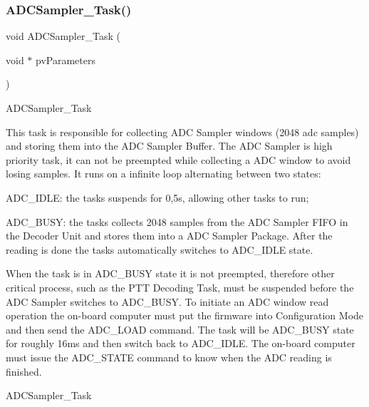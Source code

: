 \subsubsection{\texorpdfstring{A\+D\+C\+Sampler\+\_\+\+Task()}{ADCSampler\_Task()}}
{\footnotesize\ttfamily void A\+D\+C\+Sampler\+\_\+\+Task (\begin{DoxyParamCaption}\item[{void $\ast$}]{pv\+Parameters }\end{DoxyParamCaption})}

A\+D\+C\+Sampler\+\_\+\+Task

This task is responsible for collecting A\+DC Sampler windows (2048 adc samples) and storing them into the A\+DC Sampler Buffer. The A\+DC Sampler is high priority task, it can not be preempted while collecting a A\+DC window to avoid losing samples. It runs on a infinite loop alternating between two states\+:


\begin{DoxyPre}
\begin{DoxyItemize}
\item ADC\_IDLE: the tasks suspends for 0,5s, allowing other tasks to run;
\end{DoxyItemize}\end{DoxyPre}



\begin{DoxyPre}
\begin{DoxyItemize}
\item ADC\_BUSY: the tasks collects 2048 samples from the ADC Sampler FIFO
             in the Decoder Unit and stores them into a ADC Sampler Package.
             After the reading is done the tasks automatically switches to
             ADC\_IDLE state.
 
   When the task is in ADC\_BUSY state it is not preempted,
   therefore other critical process, such as the PTT Decoding Task,
   must be suspended before the ADC Sampler switches to ADC\_BUSY. To
   initiate an ADC window read operation the on-board computer must put the
   firmware into Configuration Mode and then send the ADC\_LOAD command.
   The task will be ADC\_BUSY state for roughly 16ms and then switch
   back to ADC\_IDLE. The on-board computer must issue the
   ADC\_STATE command to know when the ADC reading is finished.
\end{DoxyItemize}\end{DoxyPre}



\begin{DoxyPre}ADCSampler\_Task\end{DoxyPre}



